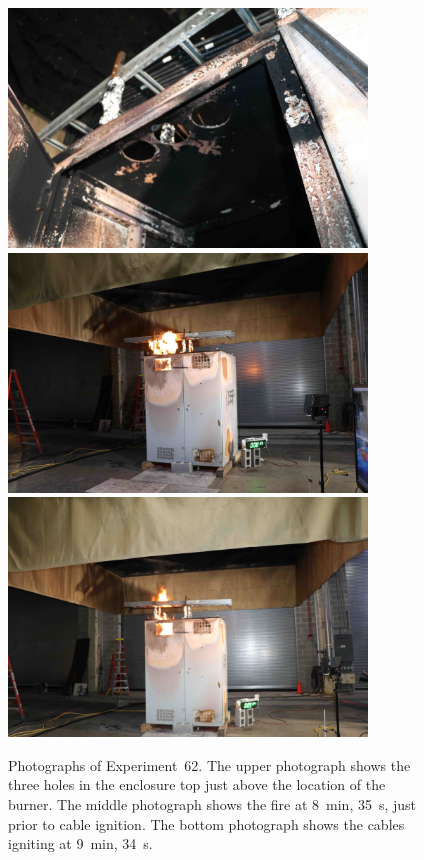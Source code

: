 \begin{figure}[p]
\centering
\includegraphics[height=2.50in]{../FIGURES/Test_62_cables} \\ \vspace{0.1in}
\includegraphics[height=2.50in]{../FIGURES/Test_62_8_min_35_s} \\ \vspace{0.1in}
\includegraphics[height=2.50in]{../FIGURES/Test_62_9_min_34_s}
\caption[Photographs of Experiment~62]{Photographs of Experiment~62. The upper photograph shows the three holes in the enclosure top just above the location of the burner. The middle photograph shows the fire at 8~min, 35~s, just prior to cable ignition. The bottom photograph shows the cables igniting at 9~min, 34~s.}
\label{fig:Test_62_photos}
\end{figure}


